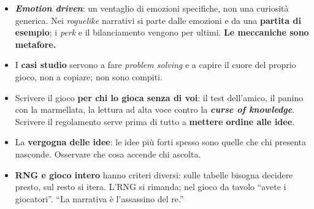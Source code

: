 \begin{itemize}
        (\emph{Fate}, \emph{Not the End}) sono focalizzati su qualcosa.
  \item \textbf{\emph{Emotion driven}}: un ventaglio di emozioni specifiche, non una
        curiosità generica. Nei \emph{roguelike} narrativi si parte dalle emozioni e da
        una \textbf{partita di esempio}; i \emph{perk} e il bilanciamento vengono per
        ultimi. \textbf{Le meccaniche sono metafore.}
  \item I \textbf{casi studio} servono a fare \emph{problem solving} e a capire il cuore
        del proprio gioco, non a copiare; non sono compiti.
  \item Scrivere il gioco \textbf{per chi lo gioca senza di voi}: il test dell'amico, il
        panino con la marmellata, la lettura ad alta voce contro la \textbf{\emph{curse
        of knowledge}}. Scrivere il regolamento serve prima di tutto a \textbf{mettere
        ordine alle idee}.
  \item La \textbf{vergogna delle idee}: le idee più forti spesso sono quelle che chi
        presenta nasconde. Osservare che cosa accende chi ascolta.
  \item \textbf{RNG e gioco intero} hanno criteri diversi: sulle tabelle bisogna decidere
        presto, sul resto si itera. L'RNG si rimanda; nel gioco da tavolo ``avete i
        giocatori''. ``La narrativa è l'assassino del re.''
\end{itemize}
